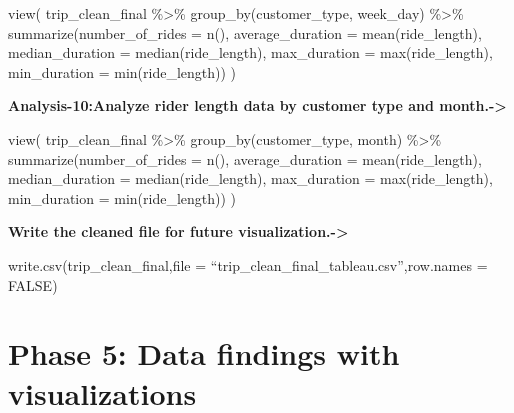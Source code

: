 \documentclass[
]{article}
\newenvironment{Shaded}{\begin{snugshade}}{\end{snugshade}}
\newcommand{\AttributeTok}[1]{\textcolor[rgb]{0.77,0.63,0.00}{#1}}
\newcommand{\FunctionTok}[1]{\textcolor[rgb]{0.00,0.00,0.00}{#1}}
\newcommand{\NormalTok}[1]{#1}
\newcommand{\SpecialCharTok}[1]{\textcolor[rgb]{0.00,0.00,0.00}{#1}}
\begin{document}
\begin{Shaded}
\begin{Highlighting}[]
\FunctionTok{view}\NormalTok{(}
\NormalTok{trip\_clean\_final }\SpecialCharTok{\%\textgreater{}\%} 
  \FunctionTok{group\_by}\NormalTok{(customer\_type, week\_day) }\SpecialCharTok{\%\textgreater{}\%} 
  \FunctionTok{summarize}\NormalTok{(}\AttributeTok{number\_of\_rides =} \FunctionTok{n}\NormalTok{(),}
            \AttributeTok{average\_duration =} \FunctionTok{mean}\NormalTok{(ride\_length),}
            \AttributeTok{median\_duration =} \FunctionTok{median}\NormalTok{(ride\_length),}
            \AttributeTok{max\_duration =} \FunctionTok{max}\NormalTok{(ride\_length),}
            \AttributeTok{min\_duration =} \FunctionTok{min}\NormalTok{(ride\_length)) }
\NormalTok{    )}
\end{Highlighting}
\end{Shaded}

\textbf{Analysis-10:Analyze rider length data by customer type and
month.-\textgreater{}}

\begin{Shaded}
\begin{Highlighting}[]
\FunctionTok{view}\NormalTok{(}
\NormalTok{  trip\_clean\_final }\SpecialCharTok{\%\textgreater{}\%} 
    \FunctionTok{group\_by}\NormalTok{(customer\_type, month) }\SpecialCharTok{\%\textgreater{}\%} 
    \FunctionTok{summarize}\NormalTok{(}\AttributeTok{number\_of\_rides =} \FunctionTok{n}\NormalTok{(),}
              \AttributeTok{average\_duration =} \FunctionTok{mean}\NormalTok{(ride\_length),}
              \AttributeTok{median\_duration =} \FunctionTok{median}\NormalTok{(ride\_length),}
              \AttributeTok{max\_duration =} \FunctionTok{max}\NormalTok{(ride\_length),}
              \AttributeTok{min\_duration =} \FunctionTok{min}\NormalTok{(ride\_length)) }
\NormalTok{)}
\end{Highlighting}
\end{Shaded}

\textbf{Write the cleaned file for future visualization.-\textgreater{}}

write.csv(trip\_clean\_final,file =
``trip\_clean\_final\_tableau.csv'',row.names = FALSE)

\hypertarget{phase-5-data-findings-with-visualizations}{%
\section{\texorpdfstring{\textbf{Phase 5: Data findings with
visualizations}}{Phase 5: Data findings with visualizations}}\label{phase-5-data-findings-with-visualizations}}
\end{document}
